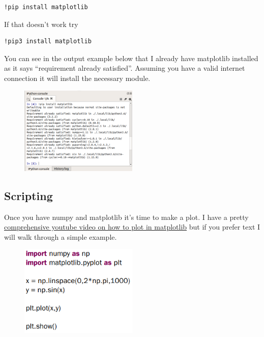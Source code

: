 \begin{verbatim}
!pip install matplotlib
\end{verbatim}

If that doesn’t work try

\begin{verbatim}
!pip3 install matplotlib
\end{verbatim}

You can see in the output example below that I already have matplotlib
installed as it says “requirement already satisfied”. Assuming you
have a valid internet connection it will install the necessary
module. 
\begin{figure}[H]
  \begin{center}
    \includegraphics[width=0.5\textwidth]{Figures/console_thonny.png}
  \end{center}
\end{figure}

\subsection{Scripting}

Once you have numpy and matplotlib it’s time to make a plot. I have a
pretty \href{https://www.youtube.com/watch?v=7nAzHPURYW0&list=PL_D7_GvGz-v1RsDs_OdNW65qRjEjmpfQx&index=8}{comprehensive youtube video on how to plot in matplotlib} but if
you prefer text I will walk through a simple example.

\begin{figure}[H]
  \begin{center}
    \includegraphics[width=0.5\textwidth]{Figures/matplotlib_example.png}
  \end{center}
\end{figure}


